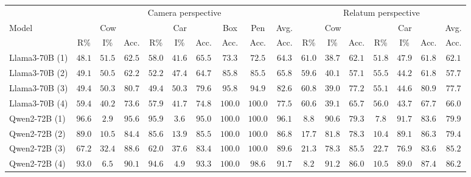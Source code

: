 \begin{table*}[t]
    \setlength{\tabcolsep}{1mm}
    \small
    \centering
    \begin{tabular}{|l| c c | c | c c | c| c | c | c || c c | c | c c | c| c |}
    \hline
     & \multicolumn{9}{|c||}{Camera perspective} & \multicolumn{7}{|c|}{Relatum perspective} \\
    \cline{2-17}
     Model & \multicolumn{3}{|c|}{Cow} & \multicolumn{3}{|c|}{Car} & Box & Pen & Avg. &\multicolumn{3}{|c|}{Cow} & \multicolumn{3}{|c|}{Car} & Avg. \\
      \cline{2-17}
       & R\% & I\% & Acc. & R\% & I\% & Acc. & Acc. & Acc. & Acc. &R\% & I\% & Acc. & R\% & I\% & Acc. & Acc. \\ 
        \hline
Llama3-70B (1) & $48.1$ & $\mathbf{51.5}$ & $62.5$ & $\mathbf{58.0}$ & $41.6$ & $65.5$ & $73.3$ & $72.5$ & $64.3$  & $\mathbf{61.0}$ & $38.7$ & $62.1$ & $\mathbf{51.8}$ & $47.9$ & $61.8$ & $62.1$ \\
Llama3-70B (2) & $49.1$ & $\mathbf{50.5}$ & $62.2$ & $\mathbf{52.2}$ & $47.4$ & $64.7$ & $85.8$ & $85.5$ & $65.8$  & $\mathbf{59.6}$ & $40.1$ & $57.1$ & $\mathbf{55.5}$ & $44.2$ & $61.8$ & $57.7$ \\
Llama3-70B (3) & $49.4$ & $\mathbf{50.3}$ & $80.7$ & $49.4$ & $\mathbf{50.3}$ & $79.6$ & $95.8$ & $94.9$ & $82.6$  & $\mathbf{60.8}$ & $39.0$ & $77.2$ & $\mathbf{55.1}$ & $44.6$ & $80.9$ & $77.7$ \\
Llama3-70B (4) & $\mathbf{59.4}$ & $40.2$ & $73.6$ & $\mathbf{57.9}$ & $41.7$ & $74.8$ & $100.0$ & $100.0$ & $77.5$  & $\mathbf{60.6}$ & $39.1$ & $65.7$ & $\mathbf{56.0}$ & $43.7$ & $67.7$ & $66.0$ \\
\hline
Qwen2-72B (1) & $\mathbf{96.6}$ & $2.9$ & $95.6$ & $\mathbf{95.9}$ & $3.6$ & $95.0$ & $100.0$ & $100.0$ & $96.1$  & $8.8$ & $\mathbf{90.6}$ & $79.3$ & $7.8$ & $\mathbf{91.7}$ & $83.6$ & $79.9$ \\
Qwen2-72B (2) & $\mathbf{89.0}$ & $10.5$ & $84.4$ & $\mathbf{85.6}$ & $13.9$ & $85.5$ & $100.0$ & $100.0$ & $86.8$  & $17.7$ & $\mathbf{81.8}$ & $78.3$ & $10.4$ & $\mathbf{89.1}$ & $86.3$ & $79.4$ \\
Qwen2-72B (3) & $\mathbf{67.2}$ & $32.4$ & $88.6$ & $\mathbf{62.0}$ & $37.6$ & $83.4$ & $100.0$ & $100.0$ & $89.6$  & $21.3$ & $\mathbf{78.3}$ & $85.5$ & $22.7$ & $\mathbf{76.9}$ & $83.6$ & $85.2$ \\
Qwen2-72B (4) & $\mathbf{93.0}$ & $6.5$ & $90.1$ & $\mathbf{94.6}$ & $4.9$ & $93.3$ & $100.0$ & $98.6$ & $91.7$  & $8.2$ & $\mathbf{91.2}$ & $86.0$ & $10.5$ & $\mathbf{89.0}$ & $87.4$ & $86.2$ \\

\end{tabular}
\end{table*}
